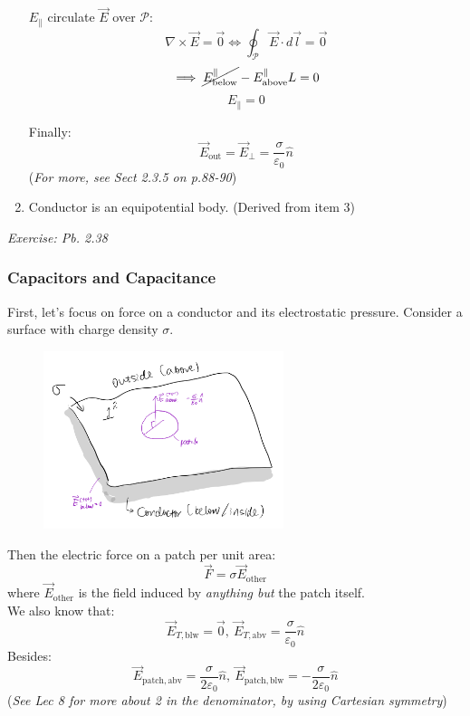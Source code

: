 \documentclass[12pt,a4paper,twoside]{article}
\numberwithin{equation}{section}
\begin{document}
\begin{enumerate}
        $E_{\parallel}$ circulate $\overrightarrow{E}$ over $\mathcal{P}$:
        \[\nabla\times \overrightarrow{E}=\overrightarrow{0}\iff \oint_{\mathcal{P}}\overrightarrow{E}\cdot d\overrightarrow{l}=\overrightarrow{0}\]
        \[\implies \cancel{E^{\parallel}_{\mathrm{below}}} - E^{\parallel}_{\mathrm{above}}L=0\]
        \[E_{\parallel}=0\]
        
        Finally:
        \[\overrightarrow{E}_{\mathrm{out}}=\overrightarrow{E}_{\perp}=\frac{\sigma}{\varepsilon_0}\hat{n}\]
        (\textit{For more, see Sect 2.3.5 on p.88-90})
        
        \item Conductor is an equipotential body. (Derived from item 3)
    \end{enumerate}
    \textit{Exercise: Pb. 2.38}

\subsubsection{Capacitors and Capacitance}
    First, let's focus on force on a conductor and its electrostatic pressure. Consider a surface with charge density $\sigma$.
    \begin{figure}[ht]
        \centering
        \includegraphics[width=7cm]{250-Revision/L12-pressure.png}
    \end{figure}
    
    \noindent Then the electric force on a patch per unit area:
    \[\overrightarrow{F}=\sigma \overrightarrow{E}_{\mathrm{other}}\]
    where $\overrightarrow{E}_{\mathrm{other}}$ is the field induced by \textit{anything but} the patch itself.\\
    \newline
    \noindent We also know that:
    \[\overrightarrow{E}_{T,\mathrm{blw}}=\overrightarrow{0},\ \overrightarrow{E}_{T,\mathrm{abv}}=\frac{\sigma }{\varepsilon_0}\hat{n}\]
    Besides:
    \[\overrightarrow{E}_{\mathrm{patch,abv}}=\frac{\sigma}{2\varepsilon_0}\hat{n},\ \overrightarrow{E}_{\mathrm{patch,blw}}=-\frac{\sigma}{2\varepsilon_0}\hat{n}\]
    (\textit{See Lec 8 for more about 2 in the denominator, by using Cartesian symmetry})\\
    
\end{document}

